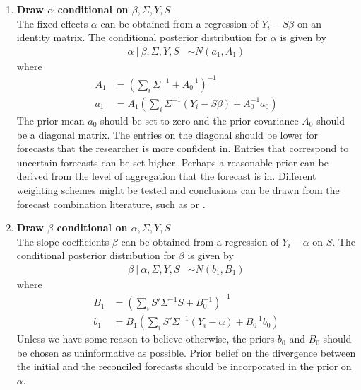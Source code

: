 \documentclass[a4paper,fleqn,11pt]{article}
\begin{document}
\begin{enumerate}
\item \textbf{Draw $\alpha$ conditional on $\beta,\Sigma,Y,S$}\\
The fixed effects $\alpha$ can be obtained from a regression of $Y_i - S\beta$ on an identity matrix. The conditional posterior distribution for $\alpha$ is given by
\begin{align}
\alpha\ |\ \beta,\Sigma,Y,S &\sim N(a_1,A_1)
\end{align}
where
\begin{align*}
A_1 &= \left(\sum_i \Sigma^{-1} + A_0^{-1}\right)^{-1} \\
a_1 &= A_1 \left(\sum_i \Sigma^{-1} (Y_i - S\beta) + A_0^{-1}a_0\right)
\end{align*}
The prior mean $a_0$ should be set to zero and the prior covariance $A_0$ should be a diagonal matrix. The entries on the diagonal should be lower for forecasts that the researcher is more confident in. Entries that correspond to uncertain forecasts can be set higher. Perhaps a reasonable prior can be derived from the level of aggregation that the forecast is in. Different weighting schemes might be tested and conclusions can be drawn from the forecast combination literature, such as \cite{Cesur2016} or \cite{Brooks2001}.\\

\item \textbf{Draw $\beta$ conditional on $\alpha,\Sigma,Y,S$}\\
The slope coefficients $\beta$ can be obtained from a regression of $Y_i - \alpha$ on $S$. The conditional posterior distribution for $\beta$ is given by
\begin{align}
\beta\ |\ \alpha,\Sigma,Y,S &\sim N(b_1,B_1)
\end{align}
where
\begin{align*}
B_1 &= \left(\sum_i S'\Sigma^{-1}S + B_0^{-1}\right)^{-1} \\
b_1 &= B_1 \left(\sum_i S'\Sigma^{-1} (Y_i - \alpha) + B_0^{-1}b_0\right)
\end{align*}
Unless we have some reason to believe otherwise, the priors $b_0$ and $B_0$ should be chosen as uninformative as possible. Prior belief on the divergence between the initial and the reconciled forecasts should be incorporated in the prior on $\alpha$. \\


\end{enumerate}
\end{document}
